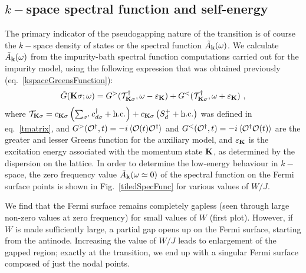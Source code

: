\documentclass[reprint,hidelinks,onecolumn]{revtex4-2}
\begin{document}
\subsection{\(k-\)space spectral function and self-energy}
The primary indicator of the pseudogapping nature of the transition is of course the \(k-\)space density of states or the spectral function \(\tilde A_{\bf k}(\omega)\). We calculate \(\tilde A_{\bf k}(\omega)\) from the impurity-bath spectral function computations carried out for the impurity model, using the following expression that was obtained previously (eq.~\ref{kspaceGreensFunction}):
\begin{equation}\begin{aligned}
	\tilde G({\bf K}\sigma; \omega) = G^>(\mathcal{T}^\dagger_{{\bf K}\sigma}, \omega - \varepsilon_{{\bf K}}) + G^<(\mathcal{T}^\dagger_{{\bf K}\sigma}, \omega + \varepsilon_{{\bf K}})~,
\end{aligned}\end{equation}
where \(\mathcal{T}_{{\bf K}\sigma} = c_{{\bf K}\sigma}\left(\sum_{\sigma^\prime}c^\dagger_{d\sigma} + \text{h.c.}\right) + c_{{\bf K}\sigma}\left(S_d^+ + \text{h.c.}\right)\) was defined in eq.~\ref{tmatrix}, and \(G^>(\mathcal{O}^\dagger, t) = -i\braket{\mathcal{O}(t)\mathcal{O}^\dagger}\) and \(G^<(\mathcal{O}^\dagger, t) = -i\braket{\mathcal{O}^\dagger\mathcal{O}(t)}\) are the greater and lesser Greens function for the auxiliary model, and \(\varepsilon_{{\bf K}}\) is the excitation energy associated with the momentum state \({\bf K}\), as determined by the dispersion on the lattice. In order to determine the low-energy behaviour in \(k-\)space, the zero frequency value \(\tilde A_{\bf k}(\omega \simeq 0)\) of the spectral function on the Fermi surface points is shown in Fig.~\ref{tiledSpecFunc} for various values of \(W/J\). 

We find that the Fermi surface remains completely gapless (seen through large non-zero values at zero frequency) for small values of \(W\) (first plot). However, if \(W\) is made sufficiently large, a partial gap opens up on the Fermi surface, starting from the antinode. Increasing the value of \(W/J\) leads to enlargement of the gapped region; exactly at the transition, we end up with a singular Fermi surface composed of just the nodal points.
\end{document}
